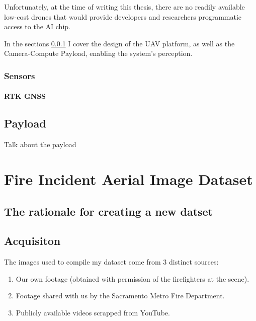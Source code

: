   Unfortunately, at the time of writing this thesis, there are no readily available low-cost drones that would provide developers and researchers
  programmatic access to the AI chip. 
  
  In the sections \ref{sec:sensors} I cover the design of the UAV platform, as well as the Camera-Compute Payload, enabling the system's perception.

  \subsubsection{Sensors}\label{sec:sensors}


  \paragraph{RTK GNSS}


  \subsection{Payload}
  Talk about the payload 


\section{Fire Incident Aerial Image Dataset}\label{sec:dataset}

  \subsection{The rationale for creating a new datset}


  \subsection{Acquisiton}

  The images used to compile my dataset come from 3 distinct sources:
  \begin{enumerate}
    \item Our own footage (obtained with permission of the firefighters at the scene).
    \item Footage shared with us by the Sacramento Metro Fire Department.
    \item Publicly available videos scrapped from YouTube.
  \end{enumerate}

